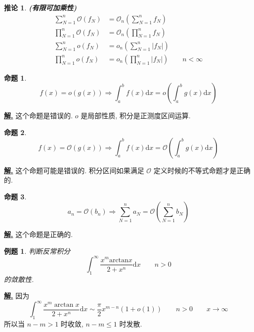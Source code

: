\documentclass[10pt,a4paper]{book}
\theoremstyle{thmstyle} %
\theoremstyle{defstyle} %
\newtheorem{corollary}{推论}[chapter]
\theoremstyle{prostyle} %
\newtheorem{proposition}{命题}[chapter]
\newtheorem{example}{例题}[chapter]
\newenvironment{solution}{\par\underline{\textbf{解.}} \;\kaishu}{\par}
\begin{document}
	\begin{corollary}
		\textbf{(有限可加乘性)}
		\begin{align*}
			\sum_{N=1}^n{\mathcal{O} \left( f_N \right)}&=\mathcal{O} _n\left( \sum_{N=1}^n{f_N} \right) 
			\\
			\prod_{N=1}^n{\mathcal{O} \left( f_N \right)}&=\mathcal{O} _n\left( \prod_{N=1}^n{f_N} \right) 
			\\
			\sum_{N=1}^n{o\left( f_N \right)}&=o_n\left( \sum_{N=1}^n{|f_N|} \right) 
			\\
			\prod_{N=1}^n{o\left( f_N \right)}&=o_n\left( \prod_{N=1}^n{|f_N|} \right) \quad\quad n<\infty
		\end{align*}
	\end{corollary}
	\begin{proposition}
		$$
		f\left( x \right) =o\left( g\left( x \right) \right) \Longrightarrow \int_a^b{f\left( x \right) \mathrm{d}x=o}\left( \int_a^b{g\left( x \right) \mathrm{d}x} \right) 
		$$
	\end{proposition}
	\begin{solution}
		这个命题是错误的. $o$ 是局部性质, 积分是正测度区间运算.
	\end{solution}
	\begin{proposition}
		$$
		f\left( x \right) =\mathcal{O} \left( g\left( x \right) \right) \Longrightarrow \int_a^b{f\left( x \right) \mathrm{d}x=\mathcal{O}}\left( \int_a^b{g\left( x \right) \mathrm{d}x} \right) 
		$$
	\end{proposition}
	\begin{solution}
		这个命题可能是错误的. 积分区间如果满足 $\mathcal{O}$ 定义时候的不等式命题才是正确的.
	\end{solution}
	\begin{proposition}
		$$
		a_n=\mathcal{O} \left( b_n \right) \Longrightarrow \sum_{N=1}^n{a_N=\mathcal{O} \left( \sum_{N=1}^n{b_N} \right)}
		$$
	\end{proposition}
	\begin{solution}
		这个命题是正确的.
	\end{solution}
	\begin{example}
		判断反常积分
		$$
		\int_1^{\infty}{\frac{x^m\mathrm{arctan} x}{2+x^n}\mathrm{d}x}\quad\quad n>0
		$$
		的敛散性.
	\end{example}
	\begin{solution}
		因为
		$$
		\int_1^{\infty}{\frac{x^m\arctan x}{2+x^n}\mathrm{d}x}\sim \frac{\pi}{2}x^{m-n}\left( 1+o\left( 1 \right) \right) \quad\quad n>0\quad\quad x\rightarrow\infty
		$$
		所以当 $n-m>1$ 时收敛, $n-m\leqslant1$ 时发散.
	\end{solution}
\end{document}
